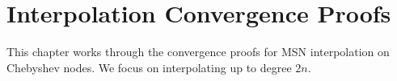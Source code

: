 \chapter{Interpolation Convergence Proofs}
\label{chap:cvip_converge}

This chapter works through the convergence proofs for MSN interpolation on
Chebyshev nodes. We focus on interpolating up to degree $2n$.

